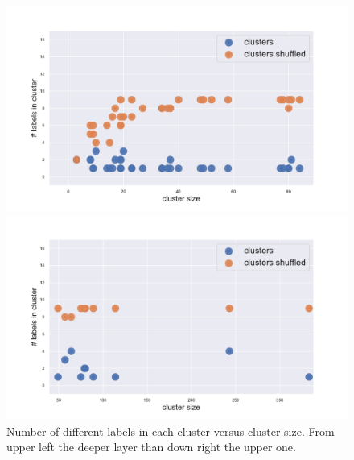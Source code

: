\begin{figure}[htb!]
\begin{minipage}{0.45\textwidth}
    \includegraphics[width=0.9\linewidth]{pictures/topic/gtex/oversigma_10tissue/shuffledcluster_shuffle_label_size_l2_primary_site.pdf}
    \end{minipage}
    \hspace{3mm}
    \begin{minipage}{0.45\textwidth}
    \includegraphics[width=0.9\linewidth]{pictures/topic/gtex/oversigma_10tissue/shuffledcluster_shuffle_label_size_l3_primary_site.pdf}
    \end{minipage}
\label{fig:topic/gtex/oversigma_10tissue/shuffledcluster_shuffle_label_size_l*}
\caption{Number of different labels in each cluster versus cluster size. From upper left the deeper layer than down right the upper one.}
\end{figure}

